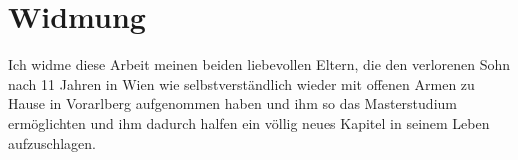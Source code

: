 \documentclass[Bachelorarbeit.tex]{subfiles}
\begin{document}
\chapter*{Widmung}
Ich widme diese Arbeit meinen beiden liebevollen Eltern, die den verlorenen Sohn nach 11 Jahren in Wien wie selbstverständlich wieder mit offenen Armen zu Hause in Vorarlberg aufgenommen haben und ihm so das Masterstudium ermöglichten und ihm dadurch halfen ein völlig neues Kapitel in seinem Leben aufzuschlagen.
\end{document}
